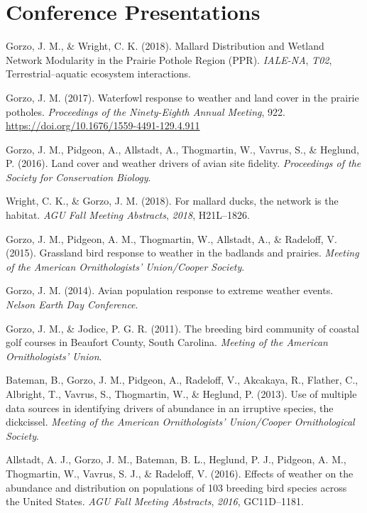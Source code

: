 \documentclass[11pt,a4paper,]{awesome-cv}
\newlength{\cslhangindent}
\newenvironment{CSLReferences}[2] %
 {\begin{list}{}{%
  \setlength{\itemindent}{0pt}
  \setlength{\leftmargin}{0pt}
  \setlength{\parsep}{0pt}
  \ifodd #1
   \setlength{\leftmargin}{\cslhangindent}
   \setlength{\itemindent}{-1\cslhangindent}
  \fi
  \setlength{\itemsep}{#2\baselineskip}}}
 {\end{list}}
\begin{document}
\section{Conference Presentations}\label{conference-presentations}

\label{refs-991d93bd90cb12ba09bf79627ab84edc}
\begin{CSLReferences}{1}{0}
Gorzo, J. M., \& Wright, C. K. (2018). Mallard Distribution and Wetland
Network Modularity in the Prairie Pothole Region (PPR). \emph{IALE-NA},
\emph{T02}, Terrestrial--aquatic ecosystem interactions.

Gorzo, J. M. (2017). Waterfowl response to weather and land cover in the
prairie potholes. \emph{Proceedings of the Ninety-Eighth Annual
Meeting}, 922. \url{https://doi.org/10.1676/1559-4491-129.4.911}

Gorzo, J. M., Pidgeon, A., Allstadt, A., Thogmartin, W., Vavrus, S., \&
Heglund, P. (2016). Land cover and weather drivers of avian site
fidelity. \emph{Proceedings of the Society for Conservation Biology}.

Wright, C. K., \& Gorzo, J. M. (2018). For mallard ducks, the network is
the habitat. \emph{AGU Fall Meeting Abstracts}, \emph{2018}, H21L--1826.

Gorzo, J. M., Pidgeon, A. M., Thogmartin, W., Allstadt, A., \& Radeloff,
V. (2015). Grassland bird response to weather in the badlands and
prairies. \emph{Meeting of the American Ornithologists' Union/Cooper
Society}.

Gorzo, J. M. (2014). Avian population response to extreme weather
events. \emph{Nelson Earth Day Conference}.

Gorzo, J. M., \& Jodice, P. G. R. (2011). The breeding bird community of
coastal golf courses in Beaufort County, South Carolina. \emph{Meeting
of the American Ornithologists' Union}.

Bateman, B., Gorzo, J. M., Pidgeon, A., Radeloff, V., Akcakaya, R.,
Flather, C., Albright, T., Vavrus, S., Thogmartin, W., \& Heglund, P.
(2013). Use of multiple data sources in identifying drivers of abundance
in an irruptive species, the dickcissel. \emph{Meeting of the American
Ornithologists' Union/Cooper Ornithological Society}.

Allstadt, A. J., Gorzo, J. M., Bateman, B. L., Heglund, P. J., Pidgeon,
A. M., Thogmartin, W., Vavrus, S. J., \& Radeloff, V. (2016). Effects of
weather on the abundance and distribution on populations of 103 breeding
bird species across the United States. \emph{AGU Fall Meeting
Abstracts}, \emph{2016}, GC11D--1181.

\end{CSLReferences}
\end{document}
